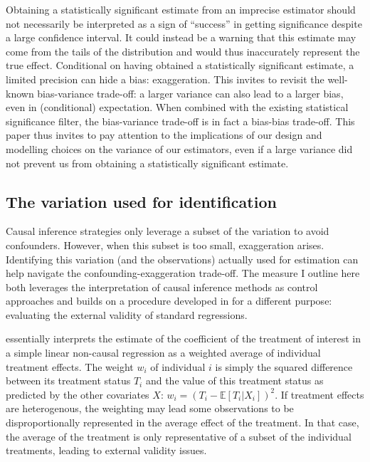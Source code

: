\documentclass[usletter, 12pt]{article}
\begin{document}
				 Obtaining a statistically significant estimate from an imprecise estimator should not necessarily be interpreted as a sign of ``success'' in getting significance despite a large confidence interval. It could instead be a warning that this estimate may come from the tails of the distribution and would thus inaccurately represent the true effect. Conditional on having obtained a statistically significant estimate, a limited precision can hide a bias: exaggeration. This invites to revisit the well-known bias-variance trade-off: a larger variance can also lead to a larger bias, even in (conditional)  expectation. When combined with the existing statistical significance filter, the bias-variance trade-off is in fact a bias-bias trade-off. This paper thus invites to pay attention to the implications of our design and modelling choices on the variance of our estimators, even if a large variance did not prevent us from obtaining a statistically significant estimate.
			
		\subsection{The variation used for identification}
		
				Causal inference strategies only leverage a subset of the variation to avoid confounders. However, when this subset is too small, exaggeration arises. Identifying this variation (and the observations) actually used for estimation can help navigate the confounding-exaggeration trade-off. The measure I outline here both leverages the interpretation of causal inference methods as control approaches and builds on a procedure developed in \cite{aronow_does_2016} for a different purpose: evaluating the external validity of standard regressions.
				
				\cite{aronow_does_2016} essentially interprets the estimate of the coefficient of the treatment of interest in a simple linear non-causal regression as a weighted average of individual treatment effects. The weight $w_{i}$ of individual $i$ is simply the squared difference between its treatment status $T_{i}$ and the value of this treatment status as predicted by the other covariates $X$: $w_{i} = (T_{i} - \mathbb{E}[T_{i} | X_{i}])^{2}$. If treatment effects are heterogenous, the weighting may lead some observations to be disproportionally represented in the average effect of the treatment. %
				In that case, the average of the treatment is only representative of a subset of the individual treatments, leading to external validity issues. 
				
\end{document}
